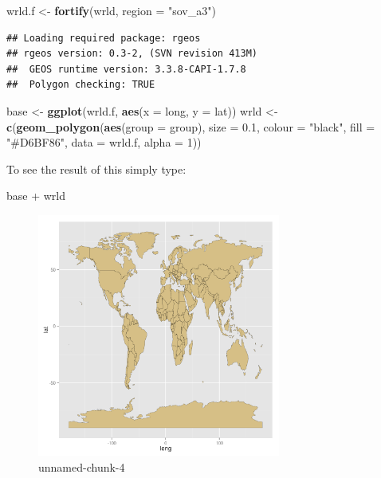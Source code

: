 \documentclass[]{article}
\newenvironment{Shaded}{}{}
\newcommand{\KeywordTok}[1]{\textcolor[rgb]{0.00,0.44,0.13}{\textbf{{#1}}}}
\newcommand{\DataTypeTok}[1]{\textcolor[rgb]{0.56,0.13,0.00}{{#1}}}
\newcommand{\DecValTok}[1]{\textcolor[rgb]{0.25,0.63,0.44}{{#1}}}
\newcommand{\FloatTok}[1]{\textcolor[rgb]{0.25,0.63,0.44}{{#1}}}
\newcommand{\StringTok}[1]{\textcolor[rgb]{0.25,0.44,0.63}{{#1}}}
\newcommand{\NormalTok}[1]{{#1}}
\let\Oldincludegraphics\includegraphics
\renewcommand{\includegraphics}[1]{\Oldincludegraphics[width=8cm]{#1}}
\begin{document}
\begin{Shaded}
\begin{Highlighting}[]
\NormalTok{wrld.f <- }\KeywordTok{fortify}\NormalTok{(wrld, }\DataTypeTok{region =} \StringTok{"sov_a3"}\NormalTok{)}
\end{Highlighting}
\end{Shaded}
\begin{verbatim}
## Loading required package: rgeos
## rgeos version: 0.3-2, (SVN revision 413M)
##  GEOS runtime version: 3.3.8-CAPI-1.7.8 
##  Polygon checking: TRUE
\end{verbatim}
\begin{Shaded}
\begin{Highlighting}[]
\NormalTok{base <- }\KeywordTok{ggplot}\NormalTok{(wrld.f, }\KeywordTok{aes}\NormalTok{(}\DataTypeTok{x =} \NormalTok{long, }\DataTypeTok{y =} \NormalTok{lat))}
\NormalTok{wrld <- }\KeywordTok{c}\NormalTok{(}\KeywordTok{geom_polygon}\NormalTok{(}\KeywordTok{aes}\NormalTok{(}\DataTypeTok{group =} \NormalTok{group), }\DataTypeTok{size =} \FloatTok{0.1}\NormalTok{, }\DataTypeTok{colour =} \StringTok{"black"}\NormalTok{, }\DataTypeTok{fill =} \StringTok{"#D6BF86"}\NormalTok{, }
    \DataTypeTok{data =} \NormalTok{wrld.f, }\DataTypeTok{alpha =} \DecValTok{1}\NormalTok{))}
\end{Highlighting}
\end{Shaded}
To see the result of this simply type:

\begin{Shaded}
\begin{Highlighting}[]
\NormalTok{base + wrld}
\end{Highlighting}
\end{Shaded}
\begin{figure}[htbp]
\centering
\includegraphics{figure/unnamed-chunk-4.png}
\caption{unnamed-chunk-4}
\end{figure}
\end{document}
